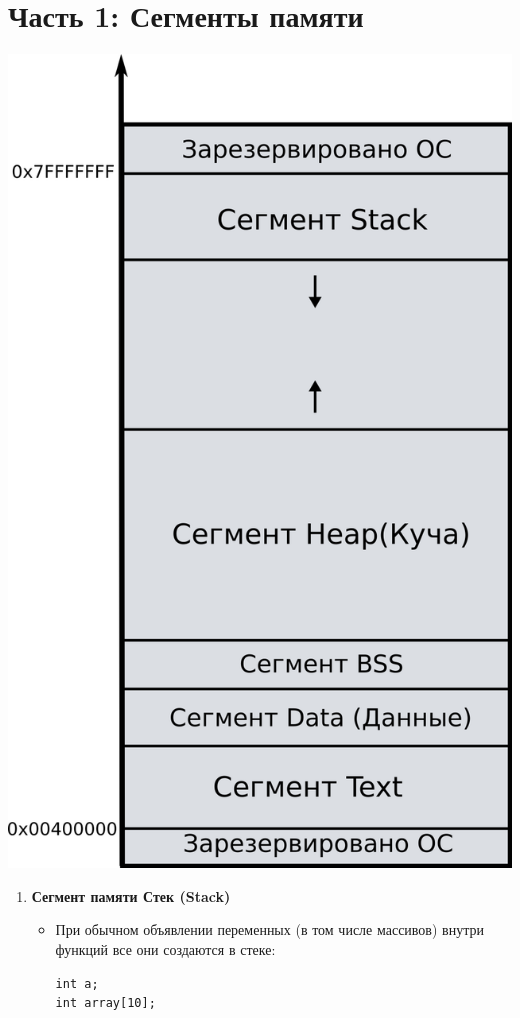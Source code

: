 \documentclass{article}
\begin{document}
\section*{Часть 1: Сегменты памяти}
\begin{multicols}{2}
\begin{center}
\includegraphics[scale=1.1]{../images/memory_layout.png}
\end{center}
\columnbreak
\begin{enumerate}
\item \textbf{Сегмент памяти Стек (Stack)} \\
\begin{itemize}
\item При обычном объявлении переменных (в том числе массивов) внутри функций все они создаются в стеке: 
\begin{lstlisting}
int a; 
int array[10];
\end{lstlisting}



\end{itemize}
\end{enumerate}
\end{multicols}
\end{document}

